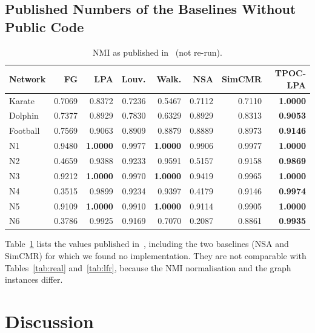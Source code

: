 \documentclass[conference]{IEEEtran}
\begin{document}
\subsection{Published Numbers of the Baselines Without Public Code}
\begin{table}[H]
\centering
\caption{NMI as published in~\cite{kong2026} (not re-run).}
\label{tab:paper}
\scriptsize\setlength{\tabcolsep}{2.4pt}
\begin{tabular}{lrrrrrrr}
\toprule
Network & FG & LPA & Louv. & Walk. & NSA & SimCMR & TPOC-LPA \\
\midrule
Karate & 0.7069 & 0.8372 & 0.7236 & 0.5467 & 0.7112 & 0.7110 & \textbf{1.0000} \\
Dolphin & 0.7377 & 0.8929 & 0.7830 & 0.6329 & 0.8929 & 0.8313 & \textbf{0.9053} \\
Football & 0.7569 & 0.9063 & 0.8909 & 0.8879 & 0.8889 & 0.8973 & \textbf{0.9146} \\
N1 & 0.9480 & \textbf{1.0000} & 0.9977 & \textbf{1.0000} & 0.9906 & 0.9977 & \textbf{1.0000} \\
N2 & 0.4659 & 0.9388 & 0.9233 & 0.9591 & 0.5157 & 0.9158 & \textbf{0.9869} \\
N3 & 0.9212 & \textbf{1.0000} & 0.9970 & \textbf{1.0000} & 0.9419 & 0.9965 & \textbf{1.0000} \\
N4 & 0.3515 & 0.9899 & 0.9234 & 0.9397 & 0.4179 & 0.9146 & \textbf{0.9974} \\
N5 & 0.9109 & \textbf{1.0000} & 0.9910 & \textbf{1.0000} & 0.9114 & 0.9905 & \textbf{1.0000} \\
N6 & 0.3786 & 0.9925 & 0.9169 & 0.7070 & 0.2087 & 0.8861 & \textbf{0.9935} \\
\bottomrule
\end{tabular}
\end{table}
Table~\ref{tab:paper} lists the values published in~\cite{kong2026}, including the two baselines (NSA and SimCMR) for which we found no implementation. They are not comparable with Tables~\ref{tab:real} and~\ref{tab:lfr}, because the NMI normalisation and the graph instances differ.

\section{Discussion}\label{sec:discussion}
\end{document}

